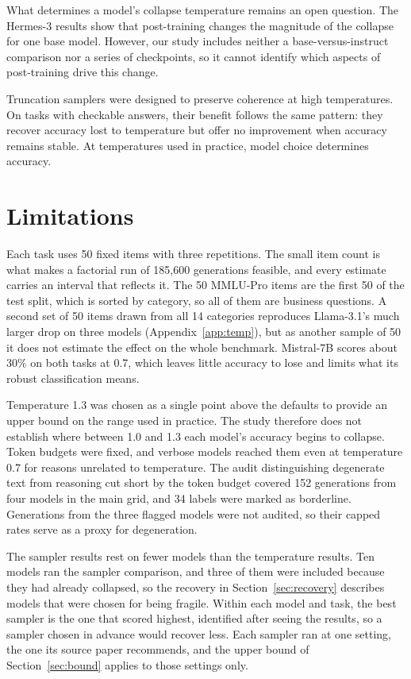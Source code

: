 \documentclass[10pt]{article}
\begin{document}
What determines a model's collapse temperature remains an open question. The Hermes-3 results
show that post-training changes the magnitude of the collapse for one base model. However, our
study includes neither a base-versus-instruct comparison nor a series of checkpoints, so it
cannot identify which aspects of post-training drive this change.

Truncation samplers were designed to preserve coherence at high temperatures. On tasks with
checkable answers, their benefit follows the same pattern: they recover accuracy lost to
temperature but offer no improvement when accuracy remains stable. At temperatures used in
practice, model choice determines accuracy.

\section*{Limitations}

Each task uses 50 fixed items with three repetitions. The small item count is what makes a
factorial run of 185,600 generations feasible, and every estimate carries an interval that
reflects it. The 50 MMLU-Pro items are the first 50 of the test split, which is sorted by
category, so all of them are business questions. A second set of 50 items drawn from all 14
categories reproduces Llama-3.1's much larger drop on three models (Appendix~\ref{app:temp}),
but as another sample of 50 it does not estimate the effect on the whole benchmark. Mistral-7B
scores about 30\% on both tasks at 0.7, which leaves little accuracy to lose and limits what its
robust classification means.

Temperature 1.3 was chosen as a single point above the defaults to provide an upper bound on
the range used in practice. The study therefore does not establish where between 1.0 and 1.3
each model's accuracy begins to collapse. Token budgets were fixed, and verbose models reached
them even at temperature 0.7 for reasons unrelated to temperature. The audit distinguishing
degenerate text from reasoning cut short by the token budget covered 152 generations from four
models in the main grid, and 34 labels were marked as borderline. Generations from the three
flagged models were not audited, so their capped rates serve as a proxy for degeneration.

The sampler results rest on fewer models than the temperature results. Ten models ran the
sampler comparison, and three of them were included because they had already collapsed, so the
recovery in Section~\ref{sec:recovery} describes models that were chosen for being fragile.
Within each model and task, the best sampler is the one that scored highest, identified after
seeing the results, so a sampler chosen in advance would recover less. Each sampler ran at one
setting, the one its source paper recommends, and the upper bound of Section~\ref{sec:bound}
applies to those settings only.
\end{document}
